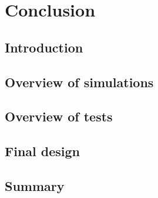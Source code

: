 \chapter{Conclusion}
\cleardoublepage

\minitoc

\section{Introduction}
\begin{refsection}
  \label{ch5:Introduction}
  \section{Overview of simulations}

  \section{Overview of tests}

  \section{Final design}

  \section{Summary}
  \label{ch5:Summary}

\end{refsection}